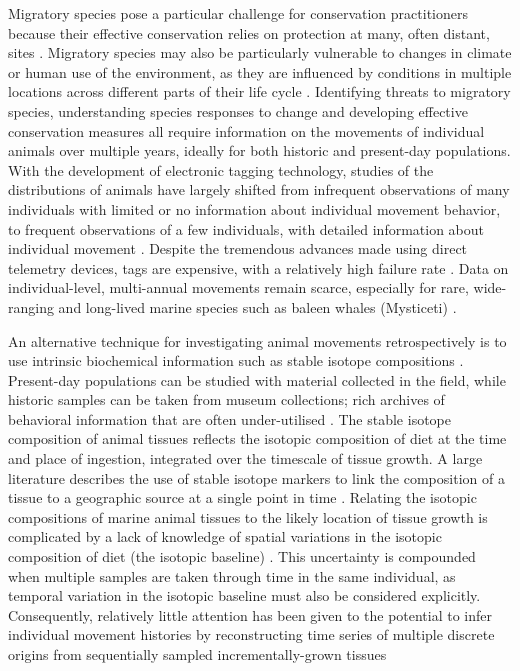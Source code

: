 \documentclass[a4paper,12pt]{article}
\begin{document}
Migratory species pose a particular challenge for conservation practitioners because their effective conservation relies on protection at many, often distant, sites \citep{runge2014conserving}. 
Migratory species may also be particularly vulnerable to changes in climate or human use of the environment, as they are influenced by conditions in multiple locations across different parts of their life cycle \citep{robinson2009travelling}. 
Identifying threats to migratory species, understanding species responses to change and developing effective conservation measures all require information on the movements of individual animals over multiple years, ideally for both historic and present-day populations. 
With the development of electronic tagging technology, studies of the distributions of animals have largely shifted from infrequent observations of many individuals with limited or no information about individual movement behavior, to frequent observations of a few individuals, with detailed information about individual movement \citep{holdo2013inferring}. 
Despite the tremendous advances made using direct telemetry devices, tags are expensive, with a relatively high failure rate \citep{bailey2009behavioural,best2015tag,mate2007evolution}. 
Data on individual-level, multi-annual movements remain scarce, especially for rare, wide-ranging and long-lived marine species such as baleen whales (Mysticeti) \citep{ryan2013stable,hall2005stable,bailey2009behavioural}.

An alternative technique for investigating animal movements retrospectively is to use intrinsic biochemical information such as stable isotope compositions \citep{west2006stable,busquets2017estimating,hobson2008tracking}. 
Present-day populations can be studied with material collected in the field, while historic samples can be taken from museum collections; rich archives of behavioral information that are often under-utilised \citep{lister2011natural}. 
The stable isotope composition of animal tissues reflects the isotopic composition of diet at the time and place of ingestion, integrated over the timescale of tissue growth. 
A large literature describes the use of stable isotope markers to link the composition of a tissue to a geographic source at a single point in time \citep{hobson2008tracking}. 
Relating the isotopic compositions of marine animal tissues to the likely location of tissue growth is complicated by a lack of knowledge of spatial variations in the isotopic composition of diet (the isotopic baseline) \citep{west2006stable,mcmahon2015millennial}. 
This uncertainty is compounded when multiple samples are taken through time in the same individual, as temporal variation in the isotopic baseline must also be considered explicitly. 
Consequently, relatively little attention has been given to the potential to infer individual movement histories by reconstructing time series of multiple discrete origins from sequentially sampled incrementally-grown tissues 
\end{document}
